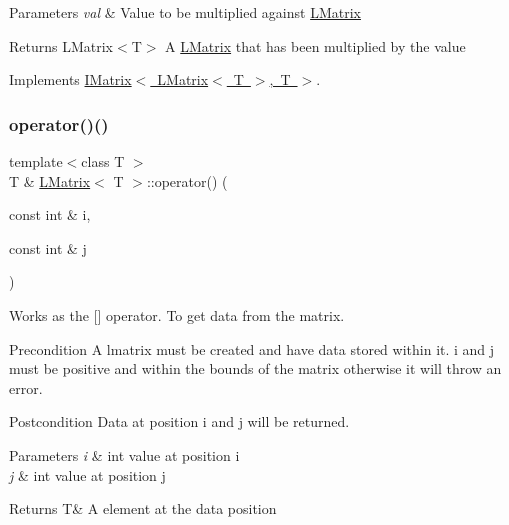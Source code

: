 \begin{DoxyParams}{Parameters}
{\em val} & Value to be multiplied against \mbox{\hyperlink{class_l_matrix}{L\+Matrix}} \\
\hline
\end{DoxyParams}
\begin{DoxyReturn}{Returns}
L\+Matrix$<$\+T$>$ A \mbox{\hyperlink{class_l_matrix}{L\+Matrix}} that has been multiplied by the value 
\end{DoxyReturn}


Implements \mbox{\hyperlink{class_i_matrix_a10121e038635bdf33552c6a1fb288398}{I\+Matrix$<$ L\+Matrix$<$ T $>$, T $>$}}.

\mbox{\label{class_l_matrix_aa0b1bc37d56538dbdd4fcb3b88dcc3ec}} 
\subsubsection{\texorpdfstring{operator()()}{operator()()}\hspace{0.1cm}{\footnotesize\ttfamily [1/2]}}
{\footnotesize\ttfamily template$<$class T $>$ \\
T \& \mbox{\hyperlink{class_l_matrix}{L\+Matrix}}$<$ T $>$\+::operator() (\begin{DoxyParamCaption}\item[{const int \&}]{i,  }\item[{const int \&}]{j }\end{DoxyParamCaption})}



Works as the \mbox{[}\mbox{]} operator. To get data from the matrix. 

\begin{DoxyPrecond}{Precondition}
A lmatrix must be created and have data stored within it. i and j must be positive and within the bounds of the matrix otherwise it will throw an error. 
\end{DoxyPrecond}
\begin{DoxyPostcond}{Postcondition}
Data at position i and j will be returned.
\end{DoxyPostcond}

\begin{DoxyParams}{Parameters}
{\em i} & int value at position i \\
\hline
{\em j} & int value at position j \\
\hline
\end{DoxyParams}
\begin{DoxyReturn}{Returns}
T\& A element at the data position 
\end{DoxyReturn}
\mbox{\label{class_l_matrix_ae9d404d99117892edd2fbfddfaf929f5}} 
